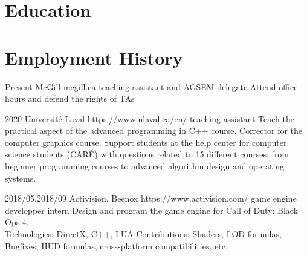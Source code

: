 \documentclass[10pt]{article} %
\begin{document}
\section{Education}







\section{Employment History}
\job
{}{Present}
{McGill}
{mcgill.ca}
{teaching assistant and AGSEM delegate}
{Attend office hours and defend the rights of TAs}

\job
{}{2020}
{Université Laval}
{https://www.ulaval.ca/en/}
{teaching assistant}
{Teach the practical aspect of the advanced programming in C++ course. Corrector for the computer graphics course. Support students at the help center for computer science students (CARÉ) with questions related to 15 different courses: from beginner programming courses to advanced algorithm design and operating systems.}

\job
{2018/05,}{2018/09}
{Activision, Beenox}
{https://www.activision.com/}
{game engine developper intern}
{Design and program the game engine for Call of Duty: Black Ops 4.\\
 Technologies: DirectX, C++, LUA 
 Contributions: Shaders, LOD formulas, Bugfixes, HUD formulas, cross-platform compatibilities, etc.}
\end{document}
